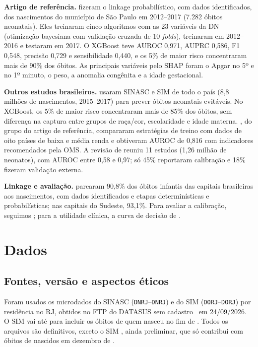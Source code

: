 \documentclass[12pt]{article}
\begin{document}
\textbf{Artigo de referência.} \cite{batista2021} fizeram o linkage probabilístico, com dados identificados, dos nascimentos do município de São Paulo em 2012--2017 (7.282 óbitos neonatais). Eles treinaram cinco algoritmos com as 23 variáveis da DN (otimização bayesiana com validação cruzada de 10 \textit{folds}), treinaram em 2012--2016 e testaram em 2017. O XGBoost teve AUROC 0,971, AUPRC 0,586, F1 0,548, precisão 0,729 e sensibilidade 0,440, e os 5\% de maior risco concentraram mais de 90\% dos óbitos. As principais variáveis pelo SHAP foram o Apgar no 5º e no 1º minuto, o peso, a anomalia congênita e a idade gestacional.

\textbf{Outros estudos brasileiros.} \cite{ramos2025} usaram SINASC e SIM de todo o país (8,8 milhões de nascimentos, 2015--2017) para prever óbitos neonatais evitáveis. No XGBoost, os 5\% de maior risco concentraram mais de 85\% dos óbitos, sem diferença na captura entre grupos de raça/cor, escolaridade e idade materna. \cite{silva2025}, do grupo do artigo de referência, compararam estratégias de treino com dados de oito países de baixa e média renda e obtiveram AUROC de 0,816 com indicadores recomendados pela OMS. A revisão de \cite{mangold2021} reuniu 11 estudos (1,26 milhão de neonatos), com AUROC entre 0,58 e 0,97; só 45\% reportaram calibração e 18\% fizeram validação externa.

\textbf{Linkage e avaliação.} \cite{maia2017} parearam 90,8\% dos óbitos infantis das capitais brasileiras aos nascimentos, com dados identificados e etapas determinísticas e probabilísticas; nas capitais do Sudeste, 93,1\%. Para avaliar a calibração, seguimos \cite{vancalster2019}; para a utilidade clínica, a curva de decisão de \cite{vickers2006}.

\section{Dados}

\subsection{Fontes, versão e aspectos éticos}

Foram usados os microdados do SINASC (\texttt{DNRJ\anoIni}--\texttt{DNRJ\anoFim}) e do SIM (\texttt{DORJ\anoIni}--\texttt{DORJ\anoObFim}) por residência no RJ, obtidos no FTP do DATASUS sem cadastro~\cite{datasus} em 24/09/2026. O SIM vai até \anoObFim{} para incluir os óbitos de quem nasceu no fim de \anoFim{}. Todos os arquivos são definitivos, exceto o SIM \anoObFim, ainda preliminar, que só contribui com óbitos de nascidos em dezembro de \anoFim{}.
\end{document}
